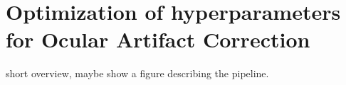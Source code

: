 \section{Optimization of hyperparameters for Ocular Artifact Correction}
short overview, maybe show a figure describing the pipeline.